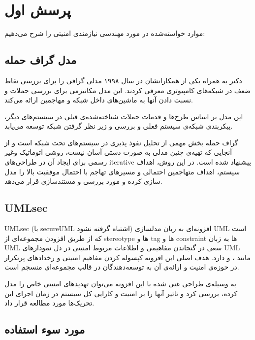 
\section{پرسش اول}
موارد خواسته‌شده در مورد مهندسی نیازمندی امنیتی را شرح می‌دهیم:

\subsection{مدل گراف حمله}
دکتر 
به همراه یکی از همکارانشان در سال ۱۹۹۸ مدلی گرافی را برای بررسی نقاط ضعف در شبکه‌های کامپیوتری معرفی کردند. این مدل مکانیزمی برای بررسی حملات و نسبت دادن آنها به ماشین‌های داخل شبکه و مهاجمین ارائه می‌کند.

این مدل بر اساس طرح‌ها و قدمات حملات شناخته‌شده‌ی قبلی در سیستم‌های دیگر، پیکربندی شبکه‌ی سیستم فعلی و بررسی و زیر نظر گرفتن شبکه توسعه می‌یابد.
\cite{attack-graph}

گراف حمله بخش مهمی از تحلیل نفوذ پذیری در سیستم‌های تحت شبکه است و
از آنجایی که تهیه‌ی چنین مدلی به صورت دستی آسان نیست، روشی اتوماتیک وغیر رسمی برای ایجاد آن در طراحی‌های iterative پیشنهاد شده است. در این روش، اهداف سیستم، اهداف متهاجمین احتمالی و مسیر‌های تهاجم با  احتمال موفقیت بالا را مدل سازی کرده و مورد بررسی  و مستندسازی قرار می‌دهد.
\cite{auto-attack-graph}

\subsection{UMLsec}

UMLsec
(با secureUML اشتباه گرفته نشود)
افزونه‌ای به زبان مدلسازی UML است که از طریق افزودن مجموعه‌ای از 
stereotype ها و tag ها و constraint ها به زبان UML
سعی در گنجاندن مفاهیمی و اطلاعات مربوط امنیتی در دل نمودار‌های UML مانند
،
و 
دارد.
هدف اصلی این افزونه کپسوله کردن مفاهیم امنیتی و رخداد‌های پرتکرار در حوزه‌ی امنیت و ارائه‌ی آن به توسعه‌دهندگان در قالب مجموعه‌ای منسجم است.

به وسیله‌ی طراحی غنی شده با این افزونه می‌توان تهدید‌های امنیتی خاص را مدل کرده، بررسی کرد و تاثیر آنها را بر امنیت و کارایی کل سیستم در زمان اجرای این تحریک‌ها مورد مطالعه قرار داد.
\cite{umlsec}

\subsection{مورد سوء استفاده}

